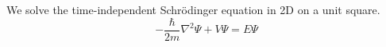 \documentclass[a4paper,11pt]{scrartcl}
\begin{document}
We solve the time-independent Schrödinger equation in 2D on a unit square.
\[ -\frac{\hbar}{2m} \nabla^2 \Psi + V \Psi = E \Psi\]
\end{document}
